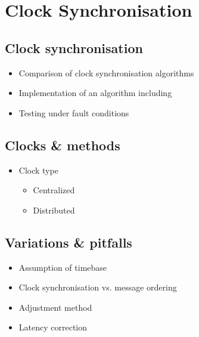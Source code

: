 
\section{Clock Synchronisation}

\subsection{Clock synchronisation}
  \begin{itemize}
    \item \begin{large}Comparison of clock synchronisation algorithms\end{large}
    \item \begin{large}Implementation of an algorithm including\end{large}
    \item \begin{large}Testing under fault conditions\end{large}
  \end{itemize}

\subsection{Clocks \& methods}
  \begin{center}
  \begin{itemize}
    \item \begin{large}Clock type\end{large}
    \begin{itemize}
      \item Centralized
      \item Distributed
    \end{itemize}
  \end{itemize}
  \end{center}


\subsection{Variations \& pitfalls}
\begin{center}
\begin{itemize}
  \item \begin{large}Assumption of timebase\end{large}
  \item \begin{large}Clock synchronisation vs. message ordering\end{large}
  \item \begin{large}Adjustment method\end{large}
  \item \begin{large}Latency correction\end{large}
\end{itemize}
\end{center}
